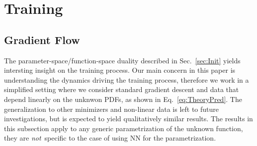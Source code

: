 \documentclass[11pt]{article}
\begin{document}
\section{Training}
\label{sec:Training}

\subsection{Gradient Flow}
\label{sec:GradFlow}

The parameter-space/function-space duality described in Sec.~\ref{sec:Init} yields intersting insight
on the training process. Our main concern in this paper is understanding the dynamics driving the 
training process, therefore we work in a simplified setting where we consider standard gradient descent 
and data that depend linearly on the unknwon PDFs, as shown in Eq.~\eqref{eq:TheoryPred}. The generalization
to other minimizers and non-linear data is left to future investigations, but is expected to yield 
qualitatively similar results. The results
in this subsection apply to any generic parametrization of the unknown function, they are {\em not}\ 
specific to the case of using NN for the parametrization. 
\end{document}
